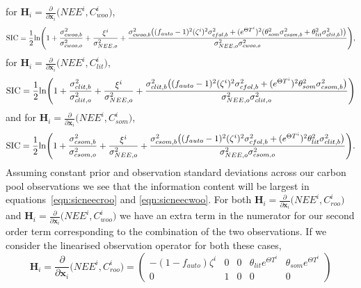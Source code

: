 \documentclass[11pt]{article}
\begin{document}
for \(\textbf{H}_{i} = \frac{\partial}{\partial \textbf{x}_{i}}\big(NEE^{i}, C_{woo}^{i} \big) \),
\begin{equation}
\text{SIC} = \frac{1}{2}\text{ln} \Bigg( 1 + \frac{\sigma_{cwoo,b}^{2}}{\sigma_{cwoo,o}^{2}} + \frac{\xi^{i}}{\sigma_{NEE,o}^{2}} + \\
 \frac{\sigma_{cwoo,b}^{2}\big((f_{auto}-1)^{2}(\zeta^{i})^{2}\sigma_{cfol,b}^{2} + (e^{\Theta T^{i}})^2(\theta_{som}^2\sigma_{csom,b}^2+\theta_{lit}^2\sigma_{clit,b}^2)\big)}{\sigma_{NEE,o}^{2}\sigma_{cwoo,o}^{2}} \Bigg), \label{eqn:sicneecwoo}
 \end{equation}
 for \(\textbf{H}_{i} = \frac{\partial}{\partial \textbf{x}_{i}}\big(NEE^{i}, C_{lit}^{i} \big) \),
 \begin{equation}
\text{SIC} = \frac{1}{2}\text{ln} \Bigg( 1 + \frac{\sigma_{clit,b}^{2}}{\sigma_{clit,o}^{2}} + \frac{\xi^{i}}{\sigma_{NEE,o}^{2}} + \\
 \frac{\sigma_{clit,b}^{2}\big((f_{auto}-1)^{2}(\zeta^{i})^{2}\sigma_{cfol,b}^{2} + (e^{\Theta T^{i}})^2\theta_{som}^2\sigma_{csom,b}^2\big)}{\sigma_{NEE,o}^{2}\sigma_{clit,o}^{2}} \Bigg) \label{eqn:sicneeclit}
 \end{equation}
 and for \(\textbf{H}_{i} = \frac{\partial}{\partial \textbf{x}_{i}}\big(NEE^{i}, C_{som}^{i} \big) \),
 \begin{equation}
\text{SIC} = \frac{1}{2}\text{ln} \Bigg( 1 + \frac{\sigma_{csom,b}^{2}}{\sigma_{csom,o}^{2}} + \frac{\xi^{i}}{\sigma_{NEE,o}^{2}} + \\
 \frac{\sigma_{csom,b}^{2}\big((f_{auto}-1)^{2}(\zeta^{i})^{2}\sigma_{cfol,b}^{2} + (e^{\Theta T^{i}})^2\theta_{lit}^2\sigma_{clit,b}^2\big)}{\sigma_{NEE,o}^{2}\sigma_{csom,o}^{2}} \Bigg). \label{eqn:sicneecsom}
 \end{equation}
Assuming constant prior and observation standard deviations across our carbon pool observations we see that the information content will be largest in equations~\eqref{eqn:sicneecroo} and \eqref{eqn:sicneecwoo}. For both \(\textbf{H}_{i} = \frac{\partial}{\partial \textbf{x}_{i}}\big(NEE^{i}, C_{roo}^{i} \big) \) and \(\textbf{H}_{i} = \frac{\partial}{\partial \textbf{x}_{i}}\big(NEE^{i}, C_{woo}^{i} \big) \) we have an extra term in the numerator for our second order term corresponding to the combination of the two observations. If we consider the linearised observation operator for both these cases,
\begin{equation}
\textbf{H}_{i} = \frac{\partial}{\partial \textbf{x}_{i}}\big(NEE^{i}, C_{roo}^{i} \big) =
 \begin{pmatrix}
-(1-f_{auto})\zeta^i & 0 & 0 & \theta_{lit} e^{\Theta T^{i}} & \theta_{som} e^{\Theta T^{i}}\\
0 & 1 & 0 & 0 & 0
\end{pmatrix}
\end{equation}
\end{document}
